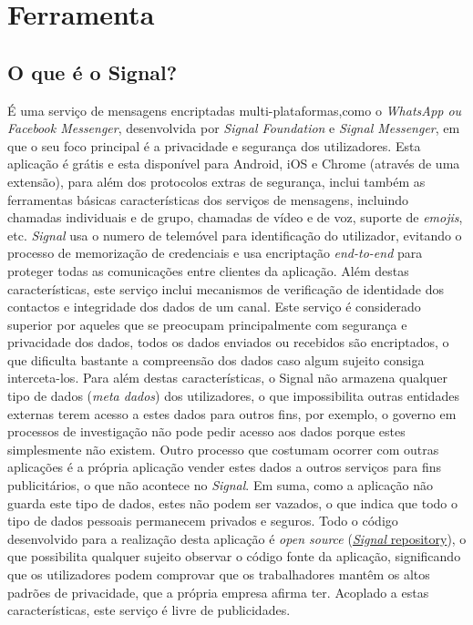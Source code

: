 \section{Ferramenta}

\vspace{-0.1cm}
\subsection{O que é o Signal?}
\label{sec:signal}

É uma serviço de mensagens encriptadas multi-plataformas,como o \textit{WhatsApp ou Facebook Messenger}, desenvolvida por \textit{Signal Foundation} e \textit{Signal Messenger}, em que o seu foco principal é a privacidade e segurança dos utilizadores.
Esta aplicação é grátis e esta disponível para  Android, iOS e Chrome (através de uma extensão),
para além dos protocolos extras de segurança, inclui também as ferramentas básicas características dos serviços de mensagens, incluindo chamadas individuais e de grupo, chamadas de vídeo e de voz, suporte de \textit{emojis}, etc.\newline
\textit{Signal} usa o numero de telemóvel para identificação do utilizador, evitando o processo de memorização de credenciais e usa encriptação \textit{end-to-end} para proteger todas as comunicações entre clientes da aplicação.\newline
Além destas características, este serviço inclui mecanismos de verificação de identidade dos contactos e integridade dos dados de um canal.\newline
Este serviço é considerado superior por aqueles que se preocupam principalmente com segurança e privacidade dos dados, todos os dados enviados ou recebidos são encriptados, o que dificulta bastante a compreensão dos dados caso algum sujeito consiga interceta-los.
Para além destas características, o Signal não armazena qualquer tipo de dados (\textit{meta dados}) dos utilizadores, o que impossibilita outras entidades externas terem acesso a estes dados para outros fins, por exemplo, o governo em processos de investigação não pode pedir acesso aos dados porque estes simplesmente não existem. Outro processo que costumam ocorrer com outras aplicações é a própria aplicação vender estes dados a outros serviços para fins publicitários, o que não acontece no \textit{Signal}. Em suma, como a aplicação não guarda este tipo de dados, estes não podem ser vazados, o que indica que todo o tipo de dados pessoais permanecem privados e seguros.\newline
Todo o código desenvolvido para a realização desta aplicação é \textit{open source} (\hyperlink{https://github.com/signalapp}{\textit{Signal} repository}), o que possibilita qualquer sujeito observar o código fonte da aplicação, significando que os utilizadores podem comprovar que os trabalhadores mantêm os altos padrões de privacidade, que a própria empresa afirma ter. Acoplado a estas características, este serviço é livre de publicidades.

